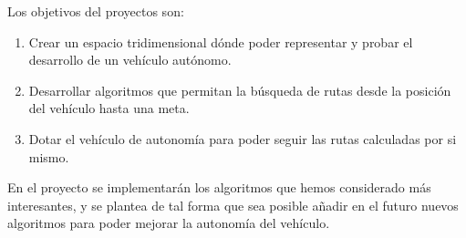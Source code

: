 Los objetivos del proyectos son:

\begin{enumerate}
\item Crear un espacio tridimensional dónde poder representar y probar el desarrollo de un vehículo autónomo.
\item Desarrollar algoritmos que permitan la búsqueda de rutas desde la posición del vehículo hasta una meta.
\item Dotar el vehículo de autonomía para poder seguir las rutas calculadas por si mismo.
\end{enumerate}

En el proyecto se implementarán los algoritmos que hemos considerado más interesantes, y se plantea de tal forma que sea posible añadir en el futuro nuevos algoritmos para poder mejorar la autonomía del vehículo.
